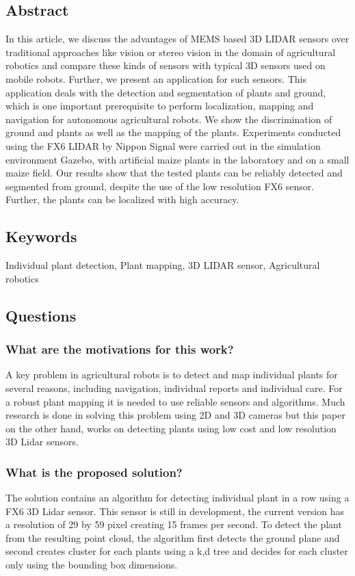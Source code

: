 \documentclass{article}
\begin{document}
\subsection*{Abstract}

In this article, we discuss the advantages of MEMS based 3D LIDAR sensors over traditional approaches
like vision or stereo vision in the domain of agricultural robotics and compare these kinds of sensors
with typical 3D sensors used on mobile robots. Further, we present an application for such sensors. This
application deals with the detection and segmentation of plants and ground, which is one important
prerequisite to perform localization, mapping and navigation for autonomous agricultural robots. We
show the discrimination of ground and plants as well as the mapping of the plants. Experiments conducted
using the FX6 LIDAR by Nippon Signal were carried out in the simulation environment Gazebo, with
artificial maize plants in the laboratory and on a small maize field. Our results show that the tested plants
can be reliably detected and segmented from ground, despite the use of the low resolution FX6 sensor.
Further, the plants can be localized with high accuracy.


\subsection*{Keywords}
Individual plant detection, Plant mapping, 3D LIDAR sensor, Agricultural robotics


\subsection*{Questions}

\subsubsection*{What are the motivations for this work?} 
A key problem in agricultural robots is to detect and map individual plants for several reasons, including 
navigation, individual reports and individual care. For a robust plant mapping it is needed to use reliable
sensors and algorithms. Much research is done in solving this problem 
using 2D and 3D cameras but this paper on the other hand, works on detecting plants using low cost and low resolution
3D Lidar sensors. 
\subsubsection*{What is the proposed solution?}
The solution contains an algorithm for detecting individual plant in a row using a FX6 3D Lidar sensor. 
This sensor is still in development, the current version has a resolution of 29 by 59 pixel creating 15 frames per second.
To detect the plant from the resulting point cloud, the algorithm first detects the ground plane and second  
creates cluster for each plants using a k,d tree and decides for each cluster only using the bounding box dimensions.
\end{document}
